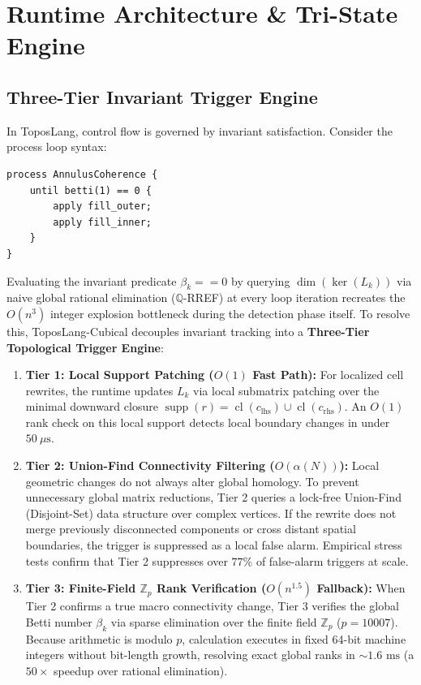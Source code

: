 \documentclass[acmsmall,screen,nonacm]{acmart}
\newcommand{\supp}{\operatorname{supp}}
\newcommand{\cl}{\operatorname{cl}}
\newcommand{\betak}{\beta_k}
\begin{document}
\section{Runtime Architecture \& Tri-State Engine}
\label{sec:runtime-architecture}

\subsection{Three-Tier Invariant Trigger Engine}
\label{sec:invariant-trigger}

In ToposLang, control flow is governed by invariant satisfaction. Consider the process loop syntax:
\begin{lstlisting}[style=taucode]
process AnnulusCoherence {
    until betti(1) == 0 {
        apply fill_outer;
        apply fill_inner;
    }
}
\end{lstlisting}

Evaluating the invariant predicate $\betak == 0$ by querying $\dim(\ker(L_k))$ via naive global rational elimination ($\mathbb{Q}$-RREF) at every loop iteration recreates the $O(n^3)$ integer explosion bottleneck during the detection phase itself. To resolve this, ToposLang-Cubical decouples invariant tracking into a \textbf{Three-Tier Topological Trigger Engine}:

\begin{enumerate}
    \item \textbf{Tier 1: Local Support Patching ($O(1)$ Fast Path):} For localized cell rewrites, the runtime updates $L_k$ via local submatrix patching over the minimal downward closure $\supp(r) = \cl(c_\mathrm{lhs}) \cup \cl(c_\mathrm{rhs})$. An $O(1)$ rank check on this local support detects local boundary changes in under $50~\mu\mathrm{s}$.
    \item \textbf{Tier 2: Union-Find Connectivity Filtering ($O(\alpha(N))$):} Local geometric changes do not always alter global homology. To prevent unnecessary global matrix reductions, Tier 2 queries a lock-free Union-Find (Disjoint-Set) data structure over complex vertices. If the rewrite does not merge previously disconnected components or cross distant spatial boundaries, the trigger is suppressed as a local false alarm. Empirical stress tests confirm that Tier 2 suppresses over $77\%$ of false-alarm triggers at scale.
    \item \textbf{Tier 3: Finite-Field $\mathbb{Z}_p$ Rank Verification ($O(n^{1.5})$ Fallback):} When Tier 2 confirms a true macro connectivity change, Tier 3 verifies the global Betti number $\betak$ via sparse elimination over the finite field $\mathbb{Z}_p$ ($p = 10007$). Because arithmetic is modulo $p$, calculation executes in fixed 64-bit machine integers without bit-length growth, resolving exact global ranks in $\sim 1.6\text{ ms}$ (a $50\times$ speedup over rational elimination).
\end{enumerate}
\end{document}
